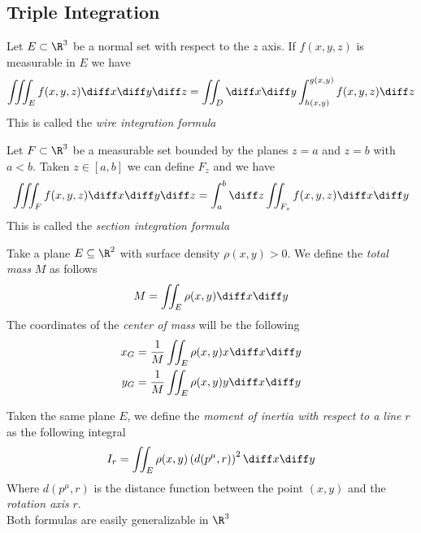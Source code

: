 \documentclass[../mmf.tex]{subfiles}
\begin{document}
\subsection{Triple Integration}
\begin{thm}
	Let $E\subset\R^3$ be a normal set with respect to the $z$ axis. If $f(x,y,z)$ is measurable in $E$ we have
	\begin{equation}
		\iiint_Ef(x,y,z)\diff x\diff y\diff z=\iint_D\diff x\diff y\int_{h(x,y)}^{g(x,y)}f(x,y,z)\diff z
		\label{eq:wireint}
	\end{equation}
	This is called the \textit{wire integration formula}
\end{thm}
\begin{thm}
	Let $F\subset\R^3$ be a measurable set bounded by the planes $z=a$ and $z=b$ with $a<b$. Taken $z\in[a,b]$ we can define $F_z$ and we have
	\begin{equation}
		\iiint_Ff(x,y,z)\diff x\diff y\diff z=\int_{a}^{b}\diff z\iint_{F_z}f(x,y,z)\diff x\diff y
		\label{eq:sectionint}
	\end{equation}
	This is called the \textit{section integration formula}
\end{thm}
\begin{thm}
	Take a plane $E\subseteq\R^2$ with surface density $\rho(x,y)>0$. We define the \textit{total mass} $M$ as follows
	\begin{equation}
		M=\iint_E\rho(x,y)\diff x\diff y
		\label{eq:totmass}
	\end{equation}
	The coordinates of the \textit{center of mass} will be the following
	\begin{equation}
		\begin{aligned}
			x_G&=\frac{1}{M}\iint_E\rho(x,y)x\diff x\diff y\\
			y_G&=\frac{1}{M}\iint_E\rho(x,y)y\diff x\diff y
		\end{aligned}
		\label{eq:cmcoord}
	\end{equation}
\end{thm}
\begin{thm}
	Taken the same plane $E$, we define the \textit{moment of inertia with respect to a line} $r$ as the following integral
	\begin{equation}
		I_r=\iint_E\rho(x,y)\left( d(p^\mu,r) \right)^2\diff x\diff y
		\label{eq:momentinertia}
	\end{equation}
	Where $d(p^\mu,r)$ is the distance function between the point $(x,y)$ and the \textit{rotation axis} $r$.\\
	Both formulas are easily generalizable in $\R^3$
\end{thm}
\end{document}
